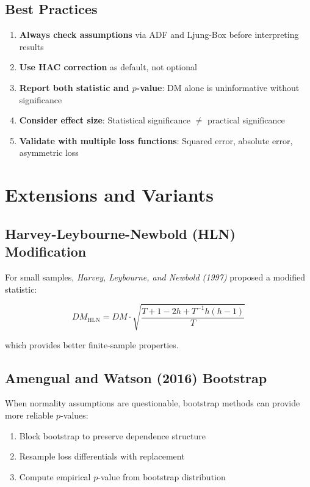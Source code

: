 \documentclass[11pt,a4paper]{article}
\begin{document}
\subsection{Best Practices}

\begin{enumerate}
    \item \textbf{Always check assumptions} via ADF and Ljung-Box before interpreting results
    \item \textbf{Use HAC correction} as default, not optional
    \item \textbf{Report both statistic and $p$-value}: DM alone is uninformative without significance
    \item \textbf{Consider effect size}: Statistical significance $\neq$ practical significance
    \item \textbf{Validate with multiple loss functions}: Squared error, absolute error, asymmetric loss
\end{enumerate}

\section{Extensions and Variants}

\subsection{Harvey-Leybourne-Newbold (HLN) Modification}

For small samples, \textit{Harvey, Leybourne, and Newbold (1997)} proposed a modified statistic:

\begin{equation}
DM_{\text{HLN}} = DM \cdot \sqrt{\frac{T + 1 - 2h + T^{-1}h(h-1)}{T}}
\end{equation}

which provides better finite-sample properties.

\subsection{Amengual and Watson (2016) Bootstrap}

When normality assumptions are questionable, bootstrap methods can provide more reliable $p$-values:

\begin{enumerate}
    \item Block bootstrap to preserve dependence structure
    \item Resample loss differentials with replacement
    \item Compute empirical $p$-value from bootstrap distribution
\end{enumerate}
\end{document}

